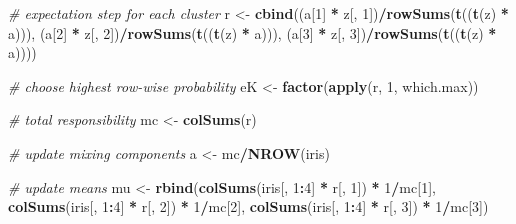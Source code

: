 \documentclass[12pt]{article}
\newenvironment{Shaded}{\begin{snugshade}}{\end{snugshade}}
\newcommand{\CommentTok}[1]{\textcolor[rgb]{0.56,0.35,0.01}{\textit{#1}}}
\newcommand{\DecValTok}[1]{\textcolor[rgb]{0.00,0.00,0.81}{#1}}
\newcommand{\FunctionTok}[1]{\textcolor[rgb]{0.13,0.29,0.53}{\textbf{#1}}}
\newcommand{\NormalTok}[1]{#1}
\newcommand{\OtherTok}[1]{\textcolor[rgb]{0.56,0.35,0.01}{#1}}
\newcommand{\SpecialCharTok}[1]{\textcolor[rgb]{0.81,0.36,0.00}{\textbf{#1}}}
\begin{document}
\begin{Shaded}
\begin{Highlighting}[]
\CommentTok{\# expectation step for each cluster}
\NormalTok{r }\OtherTok{\textless{}{-}} \FunctionTok{cbind}\NormalTok{((a[}\DecValTok{1}\NormalTok{] }\SpecialCharTok{*}\NormalTok{ z[, }\DecValTok{1}\NormalTok{])}\SpecialCharTok{/}\FunctionTok{rowSums}\NormalTok{(}\FunctionTok{t}\NormalTok{((}\FunctionTok{t}\NormalTok{(z) }\SpecialCharTok{*}\NormalTok{ a))),}
\NormalTok{           (a[}\DecValTok{2}\NormalTok{] }\SpecialCharTok{*}\NormalTok{ z[, }\DecValTok{2}\NormalTok{])}\SpecialCharTok{/}\FunctionTok{rowSums}\NormalTok{(}\FunctionTok{t}\NormalTok{((}\FunctionTok{t}\NormalTok{(z) }\SpecialCharTok{*}\NormalTok{ a))),}
\NormalTok{           (a[}\DecValTok{3}\NormalTok{] }\SpecialCharTok{*}\NormalTok{ z[, }\DecValTok{3}\NormalTok{])}\SpecialCharTok{/}\FunctionTok{rowSums}\NormalTok{(}\FunctionTok{t}\NormalTok{((}\FunctionTok{t}\NormalTok{(z) }\SpecialCharTok{*}\NormalTok{ a))))}

\CommentTok{\# choose highest row{-}wise probability}
\NormalTok{eK }\OtherTok{\textless{}{-}} \FunctionTok{factor}\NormalTok{(}\FunctionTok{apply}\NormalTok{(r, }\DecValTok{1}\NormalTok{, which.max))}

\CommentTok{\# total responsibility}
\NormalTok{mc }\OtherTok{\textless{}{-}} \FunctionTok{colSums}\NormalTok{(r)}

\CommentTok{\# update mixing components}
\NormalTok{a }\OtherTok{\textless{}{-}}\NormalTok{ mc}\SpecialCharTok{/}\FunctionTok{NROW}\NormalTok{(iris)}

\CommentTok{\# update means}
\NormalTok{mu }\OtherTok{\textless{}{-}} \FunctionTok{rbind}\NormalTok{(}\FunctionTok{colSums}\NormalTok{(iris[, }\DecValTok{1}\SpecialCharTok{:}\DecValTok{4}\NormalTok{] }\SpecialCharTok{*}\NormalTok{ r[, }\DecValTok{1}\NormalTok{]) }\SpecialCharTok{*} \DecValTok{1}\SpecialCharTok{/}\NormalTok{mc[}\DecValTok{1}\NormalTok{],}
            \FunctionTok{colSums}\NormalTok{(iris[, }\DecValTok{1}\SpecialCharTok{:}\DecValTok{4}\NormalTok{] }\SpecialCharTok{*}\NormalTok{ r[, }\DecValTok{2}\NormalTok{]) }\SpecialCharTok{*} \DecValTok{1}\SpecialCharTok{/}\NormalTok{mc[}\DecValTok{2}\NormalTok{],}
            \FunctionTok{colSums}\NormalTok{(iris[, }\DecValTok{1}\SpecialCharTok{:}\DecValTok{4}\NormalTok{] }\SpecialCharTok{*}\NormalTok{ r[, }\DecValTok{3}\NormalTok{]) }\SpecialCharTok{*} \DecValTok{1}\SpecialCharTok{/}\NormalTok{mc[}\DecValTok{3}\NormalTok{])}


\end{Highlighting}
\end{Shaded}
\end{document}
